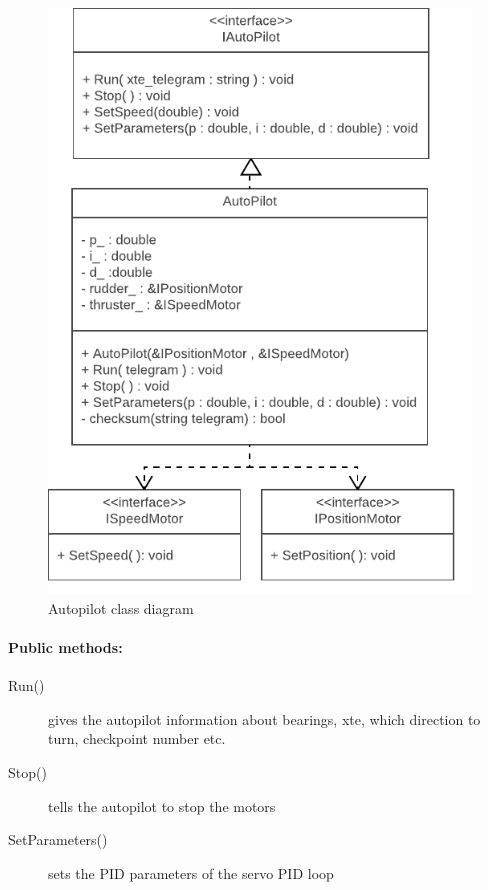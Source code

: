 \begin{figure}[H]
\centering
\includegraphics[max width=1\linewidth]{Images/Design/Autopilot_class_diagram}
\caption{Autopilot class diagram}
\label{fig:Autopilot}
\end{figure}

\paragraph{Public methods:}
\begin{adjustwidth}{2.5em}{0pt}\begin{description}
		\item [Run()] gives the autopilot information about bearings, xte, which direction to turn, checkpoint number etc.
		\item [Stop()] tells the autopilot to stop the motors
		\item [SetParameters()] sets the PID parameters of the servo PID loop
\end{description}\end{adjustwidth}

